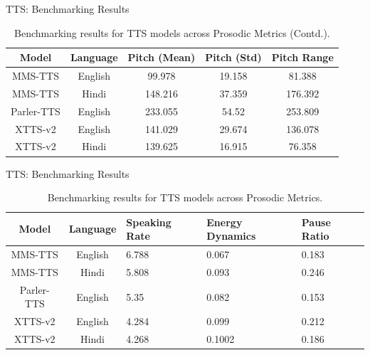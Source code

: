 \documentclass{beamer}
\begin{document}
\begin{frame}{TTS: Benchmarking Results}
    \begin{table}[]
    \centering
    \begin{tabular}{c|c|c|c|c}
        \textbf{Model} & \textbf{Language} & \textbf{Pitch (Mean)} & \textbf{Pitch (Std)} & \textbf{Pitch Range} \\
        \hline
        MMS-TTS & English & 99.978 & 19.158 & 81.388 \\
        MMS-TTS & Hindi & 148.216 & 37.359 & 176.392 \\
        Parler-TTS & English & 233.055 & 54.52 & 253.809 \\

        XTTS-v2 & English & 141.029 & 29.674 & 136.078 \\

        XTTS-v2 & Hindi & 139.625 & 16.915 & 76.358\\    
    \end{tabular}
    \caption{Benchmarking results for TTS models across Prosodic Metrics (Contd.).}
    \end{table}
\end{frame}


\begin{frame}{TTS: Benchmarking Results}
    \begin{table}[]
    \centering
    \begin{tabular}{c|c|p{2cm}|p{2cm}|p{2cm}}
        \textbf{Model} & \textbf{Language} & \textbf{Speaking Rate} & \textbf{Energy Dynamics} & \textbf{Pause Ratio} \\
        \hline
        MMS-TTS & English & 6.788 & 0.067 & 0.183 \\
        MMS-TTS & Hindi & 5.808 & 0.093 & 0.246 \\
        Parler-TTS & English & 5.35 & 0.082 & 0.153 \\
        XTTS-v2 & English & 4.284 & 0.099 & 0.212 \\

        XTTS-v2 & Hindi & 4.268 & 0.1002 & 0.186 \\    
    \end{tabular}
    \caption{Benchmarking results for TTS models across Prosodic Metrics.}
    \end{table}
\end{frame}
\end{document}
